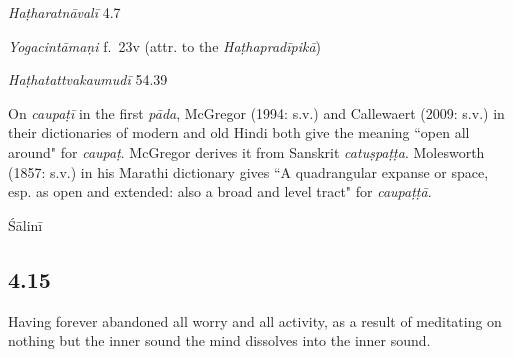 \begin{ekdosis}

\begin{testimonia}[hp04_014]
\emph{Haṭharatnāvalī} 4.7
\begin{versinnote}
\end{versinnote}

\emph{Yogacintāmaṇi} f.~23v (attr. to the \emph{Haṭhapradīpikā})
\begin{versinnote}
\end{versinnote}

\emph{Haṭhatattvakaumudī}  54.39
\begin{versinnote}
\end{versinnote}

\end{testimonia}

\begin{philcomm}[hp04_014]
On \emph{caupaṭī} in the first \emph{pāda}, McGregor (1994: s.v.) and Callewaert (2009: s.v.) in their dictionaries of modern and old Hindi both give the meaning ``open all around" for \emph{caupaṭ}. McGregor derives it from Sanskrit \emph{catuṣpaṭṭa}. Molesworth (1857: s.v.) in his Marathi dictionary gives ``A quadrangular expanse or space, esp. as open and extended: also a broad and level tract" for \emph{caupaṭṭā}.
\end{philcomm}

\begin{metre}[hp04_014]
Śālinī 
\end{metre}

\subsection*{4.15}
\begin{translation}[hp04_015]
Having forever abandoned all worry and all activity, as a result of meditating on nothing but the inner sound the mind dissolves into the inner sound.
\end{translation}


\end{ekdosis}
